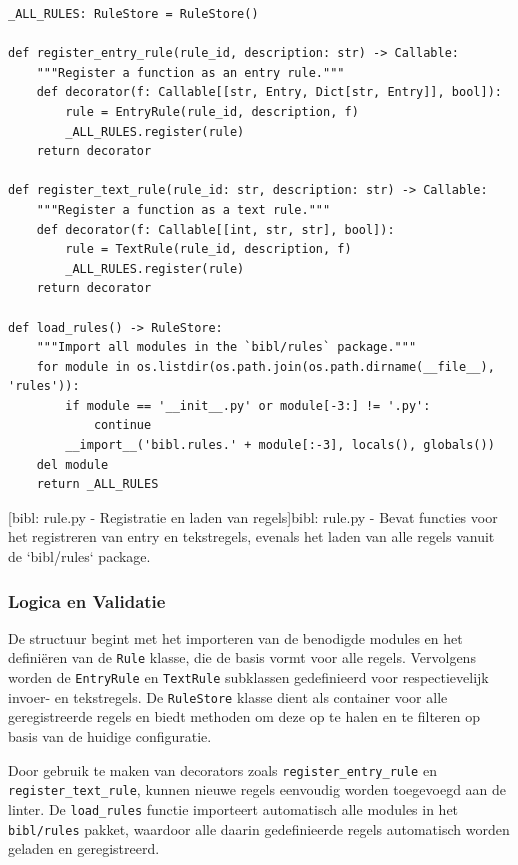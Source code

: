 \begin{verbatim}
_ALL_RULES: RuleStore = RuleStore()

def register_entry_rule(rule_id, description: str) -> Callable:
    """Register a function as an entry rule."""
    def decorator(f: Callable[[str, Entry, Dict[str, Entry]], bool]):
        rule = EntryRule(rule_id, description, f)
        _ALL_RULES.register(rule)
    return decorator

def register_text_rule(rule_id: str, description: str) -> Callable:
    """Register a function as a text rule."""
    def decorator(f: Callable[[int, str, str], bool]):
        rule = TextRule(rule_id, description, f)
        _ALL_RULES.register(rule)
    return decorator

def load_rules() -> RuleStore:
    """Import all modules in the `bibl/rules` package."""
    for module in os.listdir(os.path.join(os.path.dirname(__file__), 'rules')):
        if module == '__init__.py' or module[-3:] != '.py':
            continue
        __import__('bibl.rules.' + module[:-3], locals(), globals())
    del module
    return _ALL_RULES
\end{verbatim}
[bibl: rule.py - Registratie en laden van regels]{bibl: rule.py - Bevat functies voor het registreren van entry en tekstregels, evenals het laden van alle regels vanuit de `bibl/rules` package. \label{lst:bibl_rule_registration}}

\subsubsection{Logica en Validatie}

De structuur begint met het importeren van de benodigde modules en het definiëren van de \texttt{Rule} klasse, die de basis vormt voor alle regels. Vervolgens worden de \texttt{EntryRule} en \texttt{TextRule} subklassen gedefinieerd voor respectievelijk invoer- en tekstregels. De \texttt{RuleStore} klasse dient als container voor alle geregistreerde regels en biedt methoden om deze op te halen en te filteren op basis van de huidige configuratie.

Door gebruik te maken van decorators zoals \texttt{register\_entry\_rule} en \texttt{register\-\_text\-\_rule}, kunnen nieuwe regels eenvoudig worden toegevoegd aan de linter. De \texttt{load\_rules} functie importeert automatisch alle modules in het \texttt{bibl/rules} pakket, waardoor alle daarin gedefinieerde regels automatisch worden geladen en geregistreerd.

